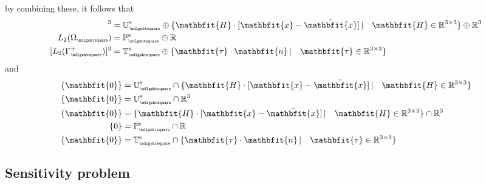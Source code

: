 \documentclass[12pt,a4paper]{article}
\renewcommand{\ta}[1]{\mathbfit{#1}}
\renewcommand{\ts}[1]{\mathbfit{#1}}
\renewcommand{\Box}{\mdlgwhtsquare}
\newcommand{\rve}{
  {\mathchoice
   {\mbox{\scalebox{0.67}{$\Box$}}}
   {\mbox{\scalebox{0.67}{$\Box$}}}
   {\mbox{\scalebox{0.5}{$\Box$}}}
   {\mbox{\scalebox{0.375}{$\Box$}}}
  }
}
\begin{document}
by combining these, it follows that
\begin{align}
[H^1(\Omega_\rve)]^{3} &= \set{U}_\rve^\fluct \oplus \{ \ts H \cdot [\ta x - \bar{\ta x}] \,|\quad \ts H \in \set{R}^{3\times 3}\}  \oplus \set R^3
\\
L_2(\Omega_\rve) &= \set{P}_\rve^\fluct \oplus \set{R}
\\
[L_2(\Gamma_\rve^+)]^{3} &= \set{T}_\rve^\fluct \oplus \{ \ts \tau \cdot \ta n \,|\quad \ts\tau \in \set{R}^{3\times 3}\}
\end{align}
and
\begin{align}
\{\ta 0\} &= \set{U}_\rve^\fluct \cap \{ \ts H \cdot [\ta x - \bar{\ta x}] \,|\quad \ts H \in \set{R}^{3\times 3}\}
\\
\{\ta 0\} &= \set{U}_\rve^\fluct \cap \set R^3
\\
\{\ta 0\} &= \{ \ts H \cdot [\ta x - \bar{\ta x}] \,|\quad \ts H \in \set{R}^{3\times 3}\} \cap \set R^3
\\
\{0\} &= \set{P}_\rve^\fluct \cap \set{R}
\\
\{\ta 0\} &= \set{T}_\rve^\fluct \cap \{ \ts \tau \cdot \ta n \,|\quad \ts\tau \in \set{R}^{3\times 3}\}
\end{align}



\newpage
\subsection{Sensitivity problem}
\label{appendix:sensitivity}
\end{document}

